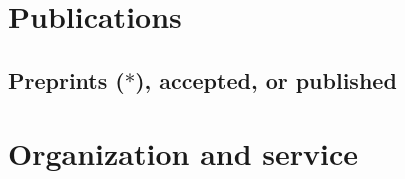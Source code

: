 \documentclass[letterpaper,11pt]{article}
\begin{document}
\begin{itemize}
\end{itemize}

\section*{Publications}

\subsection*{Preprints ($*$), accepted, or published}



\section*{Organization and service}
\end{document}
